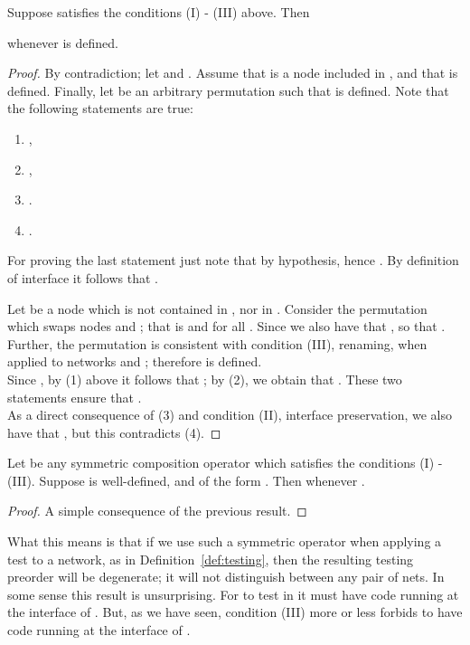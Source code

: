 \documentclass{LMCS}
\begin{document}
\begin{prop}\label{prop:I2III}
Suppose  satisfies the conditions (I) - (III) above. Then 
  
  whenever   is defined. 

\end{prop}
\begin{proof}
By contradiction; let  and 
. Assume that  is a node included in 
, and that 
 is defined. 
Finally, let  be an arbitrary permutation such that 
 is defined. 
Note that the following statements are true: 
\begin{enumerate}
\item ,
\item ,
\item .
\item .
\end{enumerate}
\noindent For proving the last statement just note that 
 by hypothesis, hence 
. 
By definition of interface it follows that 
.

Let  be a node which is not contained in , nor in . 
Consider the permutation  which swaps nodes  and ; that is 
 and  for all . 
Since  we also have that , 
so that .
Further, the permutation  is consistent with condition (III), renaming, when 
applied to networks  and ; 
therefore  is 
defined.\\ 

Since , by (1) above it follows 
that ;  
by (2), we obtain that . These two statements ensure 
that .\\
As a direct consequence of (3) and condition (II), interface preservation, we 
also have that , 
but this contradicts (4).
\end{proof}

\begin{cor}
Let  be any 
symmetric composition operator which satisfies the conditions (I) - (III). 
Suppose  is well-defined, and of the form 
. Then  whenever . 
\end{cor}
\begin{proof}
  A simple consequence of the previous result.
\end{proof}
\noindent
What this means is that if we use such a symmetric operator when applying a test to
a network, as in Definition~\ref{def:testing}, then the resulting testing preorder will
be degenerate; it will not distinguish between any pair of nets. 
In some sense this result is unsurprising. For  to test  in  it must have code running at the
interface of . But, as we have seen, condition (III) more or less forbids  to have code running at the interface of .
\end{document}
